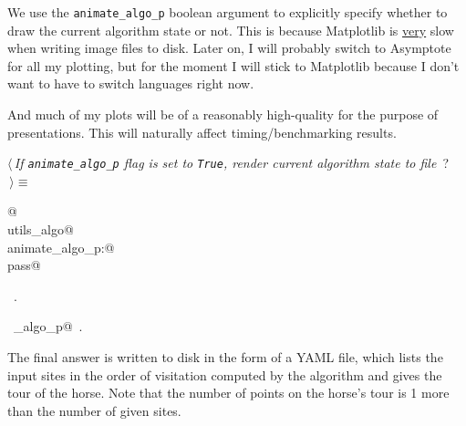 \documentclass[11.5pt]{report}
\begin{document}
\newchunk We use the \verb|animate_algo_p| boolean argument to explicitly specify whether to draw 
the current algorithm state or not. This is because Matplotlib is \underline{very} slow when writing 
image files to disk. Later on, I will probably switch to Asymptote for all my plotting, but for the 
moment I will stick to Matplotlib because I don't want to have to switch languages right now. 
 
And much of my plots will be of a reasonably high-quality for the purpose of presentations. This will naturally 
affect timing/benchmarking results. 


\begin{flushleft} \small
\begin{minipage}{\linewidth}\label{scrap27}\raggedright\small
{} $\langle\,${\itshape If \verb|animate_algo_p| flag is set to \verb|True|, render current algorithm state to file}\nobreak\ {\footnotesize {?}}$\,\rangle\equiv$
\vspace{-1ex}
\begin{list}{}{} \item
\mbox{}\verb@   @\\
\mbox{}\verb@import utils_algo@\\
\mbox{}\verb@if animate_algo_p:@\\
\mbox{}\verb@     pass@\\
\mbox{}\verb@@{\NWsep}
\end{list}
\vspace{-1.5ex}
\footnotesize
\begin{list}{}{\setlength{\itemsep}{-\parsep}\setlength{\itemindent}{-\leftmargin}}
\item \NWtxtMacroRefIn\ .
\item \NWtxtIdentsUsed\nobreak\  \verb@animate_algo_p@\nobreak\ .
\item{}
\end{list}
\end{minipage}\vspace{4ex}
\end{flushleft}
\newchunk The final answer is written to disk in the form of a YAML file, which lists the input sites 
in the order of visitation computed by the algorithm and gives the tour of the horse. 
Note that the number of points on the horse's tour is 1 more than the number of given sites. 
\end{document}
